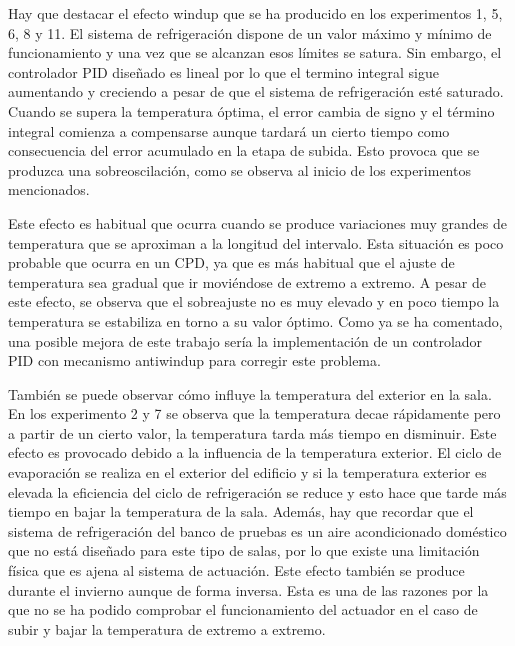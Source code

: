 	Hay que destacar el efecto windup que se ha producido en los experimentos 1, 5, 6, 8 y 11. El sistema de refrigeración dispone de un valor máximo y mínimo de funcionamiento y una vez que se alcanzan esos límites se satura. Sin embargo, el controlador PID diseñado es lineal por lo que el termino integral sigue aumentando y creciendo a pesar de que el sistema de refrigeración esté saturado. Cuando se supera la temperatura óptima, el error cambia de signo y el término integral comienza a compensarse aunque tardará un cierto tiempo como consecuencia del error acumulado en la etapa de subida. Esto provoca que se produzca una sobreoscilación, como se observa al inicio de los experimentos mencionados. 

	Este efecto es habitual que ocurra cuando se produce variaciones muy grandes de temperatura que se aproximan a la longitud del intervalo. Esta situación es poco probable que ocurra en un CPD, ya que es más habitual que el ajuste de temperatura sea gradual que ir moviéndose de extremo a extremo. A pesar de este efecto, se observa que el sobreajuste no es muy elevado y en poco tiempo la temperatura se estabiliza en torno a su valor óptimo.  Como ya se ha comentado, una posible mejora de este trabajo sería la implementación de un controlador PID con mecanismo antiwindup para corregir este problema.

	También se puede observar cómo influye la temperatura del exterior en la sala. En los experimento 2 y 7 se observa que la temperatura decae rápidamente pero a partir de un cierto valor, la temperatura tarda más tiempo en disminuir. Este efecto es provocado debido a la influencia de la temperatura exterior. El ciclo de evaporación se realiza en el exterior del edificio y si la temperatura exterior es elevada la eficiencia del ciclo de refrigeración se reduce y esto hace que tarde más tiempo en bajar la temperatura de la sala. Además, hay que recordar que el sistema de refrigeración del banco de pruebas es un aire acondicionado doméstico que no está diseñado para este tipo de salas, por lo que existe una limitación física que es ajena al sistema de actuación. Este efecto también se produce durante el invierno aunque de forma inversa. Esta es una de las razones por la que no se ha podido comprobar el funcionamiento del actuador en el caso de subir y bajar la temperatura de extremo a extremo.










